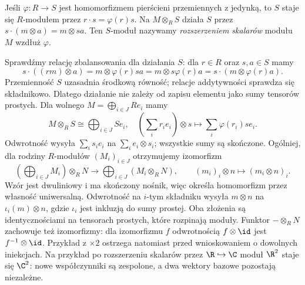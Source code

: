 \begin{definicja}
\label{def:rozszerzenie-skalarow}
Jeśli $\varphi:R\to S$ jest homomorfizmem
pierścieni przemiennych z jedynką, to $S$
staje się $R$-modułem przez $r\cdot s=\varphi(r)s$.
Na $M\otimes_R S$ działa $S$ przez
$s\cdot(m\otimes a)=m\otimes sa$.
Ten $S$-moduł nazywamy \emph{rozszerzeniem
skalarów} modułu $M$ wzdłuż $\varphi$.
\end{definicja}

Sprawdźmy relację zbalansowania dla działania
$S$: dla $r\in R$ oraz $s,a\in S$ mamy
\[
 s\cdot((rm)\otimes a)
 =m\otimes\varphi(r)sa
 =m\otimes s\varphi(r)a
 =s\cdot(m\otimes\varphi(r)a).
\]
Przemienność $S$ uzasadnia środkową równość;
relacje addytywności sprawdza się składnikowo.
Dlatego działanie nie zależy od zapisu elementu
jako sumy tensorów prostych. Dla wolnego
$M=\bigoplus_{i\in J}Re_i$ mamy
\[
 M\otimes_R S\cong\bigoplus_{i\in J}Se_i,
 \quad
 (\textstyle\sum_i r_i e_i)\otimes s
 \longmapsto\textstyle\sum_i\varphi(r_i)s e_i.
\]
Odwrotność wysyła $\sum_i s_i e_i$ na
$\sum_i e_i\otimes s_i$; wszystkie sumy są
skończone. Ogólniej, dla rodziny $R$-modułów $(M_i)_{i\in J}$
otrzymujemy izomorfizm
\[
 \left(\bigoplus_{i\in J}M_i\right)\otimes_R N
 \longrightarrow \bigoplus_{i\in J}(M_i\otimes_R N),
 \qquad (m_i)_i\otimes n\longmapsto(m_i\otimes n)_i.
\]
Wzór jest dwuliniowy i ma skończony nośnik, więc określa
homomorfizm przez własność uniwersalną. Odwrotność na
$i$-tym składniku wysyła $m\otimes n$ na $\iota_i(m)\otimes n$,
gdzie $\iota_i$ jest inkluzją do sumy prostej. Oba złożenia są
identycznościami na tensorach prostych, które rozpinają moduły.
Funktor $-\otimes_R N$ zachowuje też izomorfizmy: dla izomorfizmu $f$
odwrotnością $f\otimes\id$ jest $f^{-1}\otimes\id$.
Przykład z $\times2$ ostrzega natomiast przed
wnioskowaniem o dowolnych iniekcjach.
Na przykład po rozszerzeniu skalarów przez
$\R\hookrightarrow\C$ moduł $\R^2$ staje się
$\C^2$: nowe współczynniki są zespolone,
a dwa wektory bazowe pozostają niezależne.

